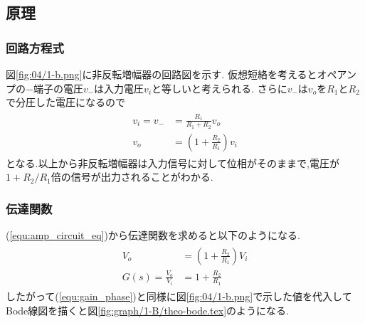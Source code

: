\subsection{原理}
\subsubsection{回路方程式}
図\ref{fig:04/1-b.png}に非反転増幅器の回路図を示す.
仮想短絡を考えるとオペアンプの$-$端子の電圧$v_{-}$は入力電圧$v_i$と等しいと考えられる.
さらに$v_-$は$v_o$を$R_1$と$R_2$で分圧した電圧になるので
\begin{align}
  \begin{split}
    \label{equ:amp_circuit_eq}
    v_i=v_-&=\frac{R_1}{R_1+R_2}v_o\\
    v_o&=\left(1+\frac{R_2}{R_1}\right)v_i
  \end{split}
\end{align}
となる.以上から非反転増幅器は入力信号に対して位相がそのままで,電圧が$1+R_2/R_1$倍の信号が出力されることがわかる.
\subsubsection{伝達関数}
(\ref{equ:amp_circuit_eq})から伝達関数を求めると以下のようになる.
\begin{align}
  \begin{split}
    V_o&=\left(1+\frac{R_2}{R_1}\right)V_i\\
    G(s)=\frac{V_o}{V_i}&=1+\frac{R_2}{R_1}
  \end{split}
\end{align}
したがって(\ref{equ:gain_phase})と同様に図\ref{fig:04/1-b.png}で示した値を代入してBode線図を描くと図\ref{fig:graph/1-B/theo-bode.tex}のようになる.
